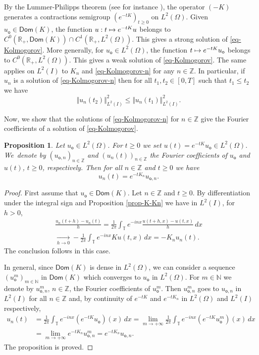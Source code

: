\documentclass[11pt]{article}
\numberwithin{equation}{section}
\def\mto{\mathchoice{\longmapsto}{\mapsto}{\mapsto}{\mapsto}}
\theoremstyle{plain}
\newtheorem{proposition}[theorem]{Proposition}
\theoremstyle{definition}
\newcommand {\limt}[2]{\xrightarrow[#1 \to #2]{}}
\newcommand{\nr}[1]{\Vert #1\Vert}
\newcommand{\1}{\mathds 1}
\newcommand{\Dom}{\mathsf{Dom}}
\newcommand{\R}{\mathbb{R}}
\newcommand{\N}{\mathbb{N}}
\newcommand{\Z}{\mathbb{Z}}
\newcommand{\T}{\mathbb{T}}
\let\O\Omega
\newcommand{\uo}{u_{\mathsf{o}}}
\newcommand{\uon}{u_{\mathsf{o},n}}
\begin{document}
By the Lummer-Philipps theorem (see for instance \cite{engel}), the operator $(-K)$ generates a contractions semigroup $(e^{-tK})_{t \geq 0}$ on $L^2(\O)$. Given $\uo \in \Dom(K)$, the function $u : t \mto e^{-tK} u$ belongs to $C^0(\R_+,\Dom(K)) \cap C^1(\R_+,L^2(\O))$. This gives a strong solution of \eqref{eq-Kolmogorov}. More generally, for $\uo \in L^2(\O)$, the function $t \mto e^{-tK} \uo$ belongs to $C^0(\R_+,L^2(\O))$. This gives a weak solution of \eqref{eq-Kolmogorov}. The same applies on $L^2(I)$ to $K_n$ and \eqref{eq-Kolmogorov-n} for any $n \in \Z$. In particular, if $u_n$ is a solution of \eqref{eq-Kolmogorov-n} then for all $t_1,t_2 \in [0,T]$ such that $t_1 \leq t_2$ we have
\begin{equation} \label{eq-semigroup-contraction}
\nr{u_n(t_2)}_{L^2(I)}^2 \leq \nr{u_n(t_1)}_{L^2(I)}^2.
\end{equation}

Now, we show that the solutions of \eqref{eq-Kolmogorov-n} for $n \in \Z$ give the Fourier coefficients of a solution of \eqref{eq-Kolmogorov}.

\begin{proposition} \label{prop-Fourier-propagateurs}
Let $\uo \in L^2(\O)$. For $t \geq 0$ we set $u(t) = e^{-tK} \uo \in L^2(\O)$. We~denote by $(\uon)_{n \in \Z}$ and $(u_n(t))_{n \in \Z}$ the Fourier coefficients of $\uo$ and $u(t)$, $t \geq 0$, respectively. Then for all $n \in \Z$ and $t \geq 0$ we have
\[
u_n(t) = e^{-t K_n} \uon.
\]
\end{proposition}

\begin{proof}
First assume that $\uo \in \Dom(K)$. Let $n \in \Z$ and $t \geq 0$. By differentiation under the integral sign and Proposition \ref{prop-K-Kn} we have in $L^2(I)$, for $h > 0$,
\begin{multline*}
\frac {u_n(t+h) - u_n(t)} h = \frac 1 {2\pi} \int_\T e^{-inx} \frac {u(t+h,x) - u(t,x)} h \, dx\\
\limt h 0 - \frac 1 {2\pi} \int_\T e^{-inx} K u(t,x) \, dx = -K_n u_n(t).
\end{multline*}
The conclusion follows in this case.

In general, since $\Dom(K)$ is dense in $L^2(\O)$, we can consider a sequence $(u_{\mathsf{o}}^m)_{m \in \N}$ in $\Dom(K)$ which converges to $\uo$ in $L^2(\O)$. For $m \in \N$ we denote by $u_{\mathsf{o},n}^m$, $n \in \Z$, the Fourier coefficients of $u_{\mathsf{o}}^m$. Then $u_{\mathsf{o},n}^m$ goes to $u_{\mathsf{o},n}$ in $L^2(I)$ for all $n \in \Z$ and, by continuity of $e^{-tK}$ and $e^{-tK_n}$ in $L^2(\O)$ and $L^2(I)$ respectively,
\begin{align*}
u_n(t)
& = \frac 1 {2\pi} \int_\T e^{-inx} (e^{-tK} \uo)(x) \,dx = \lim_{m \to +\infty} \frac 1 {2\pi} \int_\T e^{-inx} (e^{-tK} u_{\mathsf{o}}^m)(x) \,dx\\
& = \lim_{m \to +\infty} e^{-tK_n} u_{\mathsf{o},n}^m = e^{-tK_n} \uon.
\end{align*}
The proposition is proved.
\end{proof}
\end{document}
